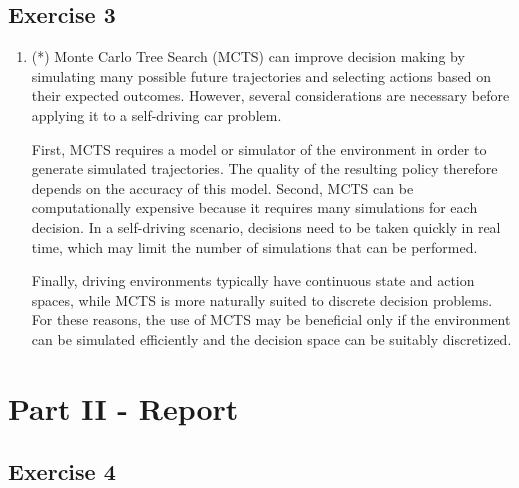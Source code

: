 \documentclass{article}
\begin{document}
\subsection*{Exercise 3}
\begin{enumerate}
    \item (*) Monte Carlo Tree Search (MCTS) can improve decision making by simulating many possible future trajectories and selecting actions based on their expected outcomes. However, several considerations are necessary before applying it to a self-driving car problem.

    First, MCTS requires a model or simulator of the environment in order to generate simulated trajectories. The quality of the resulting policy therefore depends on the accuracy of this model. Second, MCTS can be computationally expensive because it requires many simulations for each decision. In a self-driving scenario, decisions need to be taken quickly in real time, which may limit the number of simulations that can be performed.
    
    Finally, driving environments typically have continuous state and action spaces, while MCTS is more naturally suited to discrete decision problems. For these reasons, the use of MCTS may be beneficial only if the environment can be simulated efficiently and the decision space can be suitably discretized.
\end{enumerate}

\newpage
\section*{Part II - Report}
\subsection*{Exercise 4}
\end{document}
